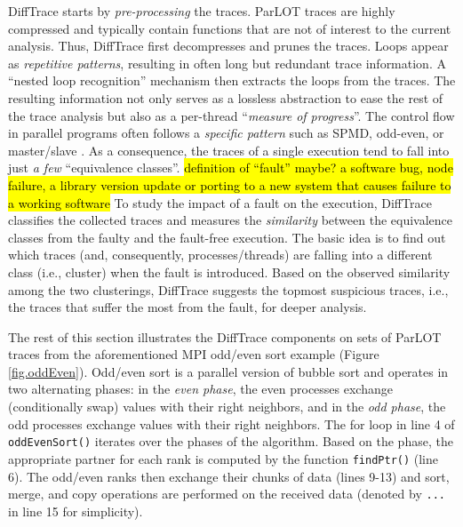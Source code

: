 DiffTrace starts by \textit{pre-processing} the traces. ParLOT traces are highly compressed and typically contain functions that are not of interest to the current analysis. Thus, DiffTrace first decompresses and prunes the traces.
%
Loops appear as \textit{repetitive patterns}, resulting in often long but redundant trace information. A ``nested loop recognition'' mechanism then extracts the loops from the traces. The resulting information not only serves as a lossless abstraction to ease the rest of the trace analysis but also as a per-thread ``\textit{measure of progress}''.
%
The control flow in parallel programs often follows a \textit{specific pattern} such as SPMD, odd-even, or master/slave \cite{?}. As a consequence, the traces of a single execution tend to fall into just \textit{a few} ``equivalence classes''. 
%
%
\hl{definition of ``fault'' maybe? a software bug, node failure, a library version update or porting to a new system that causes failure to a working software }
To study the impact of a fault on the execution, DiffTrace classifies the collected traces and measures the \textit{similarity} between the equivalence classes from the faulty and the fault-free execution.
%
The basic idea is to find out which traces (and, consequently, processes/threads) are falling into a different class (i.e., cluster) when the fault is introduced.
%
Based on the observed similarity among the two clusterings, DiffTrace suggests the topmost suspicious traces, i.e., the traces that suffer the most from the fault, for deeper analysis.
%

The rest of this section illustrates the DiffTrace components on sets of ParLOT traces from the aforementioned MPI odd/even sort example (Figure \ref{fig.oddEven}).
Odd/even sort is a parallel version of bubble sort and operates in two alternating phases: in the \textit{even phase}, the even processes exchange (conditionally swap) values with their right neighbors, and in the \textit{odd phase}, the odd processes exchange values with their right neighbors. The for loop in line 4 of \texttt{oddEvenSort()} iterates over the phases of the algorithm. Based on the phase, the appropriate partner for each rank is computed by the function \texttt{findPtr()} (line 6). The odd/even ranks then exchange their chunks of data (lines 9-13) and sort, merge, and copy operations are performed on the received data (denoted by \texttt{...} in line 15 for simplicity).

